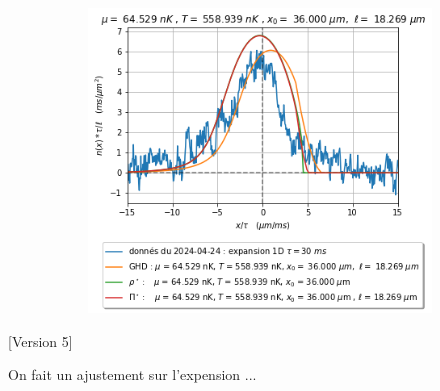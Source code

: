 \documentclass[a3, 10pt,twoside]{article}          %
\theoremstyle{plain}
\theoremstyle{definition}
\theoremstyle{remark}
\theoremstyle{definition} %
\begin{document}
\begin{figure}[H]
\begin{subfigure}[b]{0.32\textwidth}
        \caption{}
        \label{fig:expansion_1_expansion}
    \end{subfigure}
    \hfill
    \begin{subfigure}[b]{0.32\textwidth}
        \centering
        \includegraphics[width=\textwidth]{Figures/simul_expansion_30_expansion_36}
        \caption{}
        \label{}
    \end{subfigure}
    
    
    
    \caption{}
    


    
    \label{}
\end{figure}
	
	
	[Version 5]
	
	On fait un ajustement sur l'expension ... 
	
\end{document}
